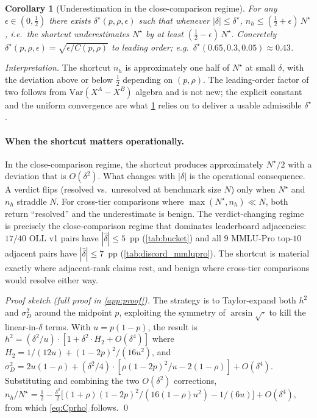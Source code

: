 \documentclass{article}
\theoremstyle{plain}
\newtheorem{corollary}{Corollary}
\theoremstyle{definition}
\begin{document}
\begin{corollary}[Underestimation in the close-comparison regime]
\label{cor:underest}
For any $\epsilon \in (0,\tfrac12)$ there exists $\delta^{\star}(p,\rho,\epsilon)$ such that whenever $|\delta| \le \delta^{\star}$, $n_h \le (\tfrac12 + \epsilon)\,N^{\star}$, i.e.\ the shortcut underestimates $N^{\star}$ by at least $(\tfrac12 - \epsilon)\,N^{\star}$. Concretely $\delta^{\star}(p,\rho,\epsilon) = \sqrt{\epsilon/C(p,\rho)}$ to leading order; e.g.\ $\delta^{\star}(0.65,0.3,0.05) \approx 0.43$.
\end{corollary}

\noindent \emph{Interpretation.} The shortcut $n_h$ is approximately one half of $N^{\star}$ at small $\delta$, with the deviation above or below $\tfrac12$ depending on $(p,\rho)$. The leading-order factor of two follows from $\mathrm{Var}(X^A-X^B)$ algebra and is not new; the explicit constant and the uniform convergence are what \cref{cor:underest} relies on to deliver a usable admissible $\delta^\star$.

\paragraph{When the shortcut matters operationally.} In the close-comparison regime, the shortcut produces approximately $N^\star/2$ with a deviation that is $O(\delta^2)$. What changes with $|\delta|$ is the operational consequence. A verdict flips (resolved vs.\ unresolved at benchmark size $N$) only when $N^{\star}$ and $n_h$ straddle $N$. For cross-tier comparisons where $\max(N^{\star}, n_h) \ll N$, both return ``resolved'' and the underestimate is benign. The verdict-changing regime is precisely the close-comparison regime that dominates leaderboard adjacencies: $17/40$ OLL v1 pairs have $|\hat\delta|\leq 5$~pp (\cref{tab:bucket}) and all $9$ MMLU-Pro top-$10$ adjacent pairs have $|\hat\delta|\leq 7$~pp (\cref{tab:discord_mmlupro}). The shortcut is material exactly where adjacent-rank claims rest, and benign where cross-tier comparisons would resolve either way.

\noindent \emph{Proof sketch (full proof in \cref{app:proof}).} The strategy is to Taylor-expand both $h^2$ and $\sigma_D^2$ around the midpoint $p$, exploiting the symmetry of $\arcsin\sqrt{\cdot}$ to kill the linear-in-$\delta$ terms. With $u = p(1{-}p)$, the result is $h^2 = (\delta^2/u)\cdot[1 + \delta^2\cdot H_2 + O(\delta^4)]$ where $H_2 = 1/(12u) + (1{-}2p)^2/(16u^2)$, and $\sigma_D^2 = 2u(1{-}\rho) + (\delta^2/4)\cdot[\rho(1{-}2p)^2/u - 2(1{-}\rho)] + O(\delta^4)$. Substituting and combining the two $O(\delta^2)$ corrections,
\(
n_h/N^{\star} = \tfrac12 - \tfrac{\delta^2}{2}\bigl[(1{+}\rho)(1{-}2p)^2/(16(1{-}\rho)u^2) - 1/(6u)\bigr] + O(\delta^4),
\)
from which \cref{eq:Cprho} follows. \qed
\end{document}
